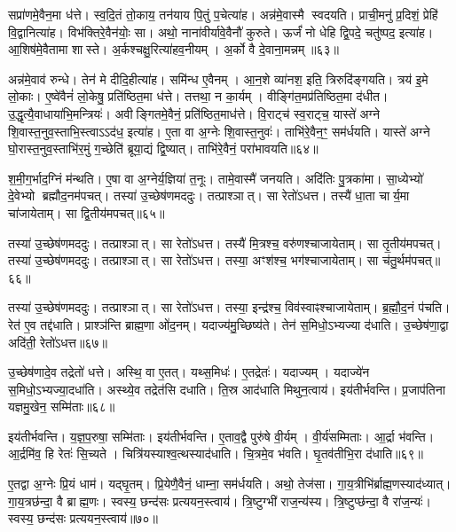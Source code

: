सप्रा॑णमे॒वैन॒मा ध॑त्ते।
स्व॒दि॒तं तो॒काय॒ तन॑याय पि॒तुं प॒चेत्या॑ह।
अन्न॑मे॒वास्मै स्वदयति।
प्राची॒मनु॑ प्र॒दिशं॒ प्रेहि॑ वि॒द्वानित्या॑ह।
विभ॑क्तिरे॒वैन॑योः॒ सा।
अथो॒ नाना॑वीर्यावे॒वैनौ॑ कुरुते।
ऊर्जं॑ नो धेहि द्वि॒पदे॒ चतु॑ष्पद॒ इत्या॑ह।
आ॒शिष॑मे॒वैतामा शास्ते।
अ॒र्कश्चक्षु॒रित्या॑हव॒नीयम्।
अ॒र्को वै दे॒वाना॒मन्नम्॥६३॥

अन्न॑मे॒वाव॑ रुन्धे।
तेन॑ मे दीदि॒हीत्या॑ह।
समि॑न्ध ए॒वैनम्।
आ॒न॒शे व्या॑नश॒ इति॒ त्रिरुदि॑ङ्गयति।
त्रय॑ इ॒मे लो॒काः।
ए॒ष्वे॑वैनं॑ लो॒केषु॒ प्रति॑ष्ठित॒मा ध॑त्ते।
तत्तथा॒ न का॒र्यम्।
वीङ्गि॑त॒मप्र॑तिष्ठित॒मा द॑धीत।
उ॒द्धृत्यै॒वाधाया॑भि॒मन्त्रियः॑।
अवीङ्गितमे॒वैनं॒ प्रति॑ष्ठित॒माध॑त्ते।
वि॒राट्च॑ स्व॒राट्च॒ यास्ते॑ अग्ने शि॒वास्त॒नुव॒स्ताभि॒स्त्वा\-ऽऽद॑ध॒ इत्या॑ह।
ए॒ता वा अ॒ग्नेः शि॒वास्त॒नुवः॑।
ताभि॑रे॒वैन॒ꣳ॒ सम॑र्धयति।
यास्ते॑ अग्ने घो॒रास्त॒नुव॒स्ताभि॑र॒मुं ग॒च्छेति॑ ब्रूया॒द्यं द्वि॒ष्यात्।
ताभि॑रे॒वैनं॒ परा॑भावयति॥६४॥\anuvakamend[लो॒को॑\-ऽसृजतैन॒माध॑त्ते\-ऽन्वाहार्य॒पच॑नं दे॒वाना॒मन्न॑मेनं॒ प्रति॑ष्ठित॒माध॑त्ते॒ पञ्च॑ च]

श॒मी॒ग॒र्भाद॒ग्निं म॑न्थति।
ए॒षा वा अ॒ग्नेर्य॒ज्ञिया॑ त॒नूः।
तामे॒वास्मै॑ जनयति।
अदि॑तिः पु॒त्रका॑मा।
सा॒ध्येभ्यो॑ दे॒वेभ्यो ब्रह्मौद॒नम॑पचत्।
तस्या॑ उ॒च्छेष॑णमददुः।
तत्प्राश्ञात्।
सा रेतो॑\-ऽधत्त।
तस्यै॑ धा॒ता चार्य॒मा चा॑जायेताम्।
सा द्वि॒तीय॑मपचत्॥६५॥

तस्या॑ उ॒च्छेष॑णमददुः।
तत्प्राश्ञात्।
सा रेतो॑\-ऽधत्त।
तस्यै॑ मि॒त्रश्च॒ वरु॑णश्चाजायेताम्।
सा तृ॒तीय॑मपचत्।
तस्या॑ उ॒च्छेष॑णमददुः।
तत्प्राश्ञात्।
सा रेतो॑\-ऽधत्त।
तस्या॒ अꣳश॑श्च॒ भग॑श्चाजायेताम्।
सा च॑तु॒र्थम॑पचत्॥६६॥

तस्या॑ उ॒च्छेष॑णमददुः।
तत्प्राश्ञात्।
सा रेतो॑\-ऽधत्त।
तस्या॒ इन्द्र॑श्च॒ विव॑स्वाꣴश्चाजायेताम्।
ब्र॒ह्मौ॒द॒नं प॑चति।
रेत॑ ए॒व तद्द॑धाति।
प्राश्ञ॑न्ति ब्राह्म॒णा ओ॑द॒नम्।
यदाज्य॑मु॒च्छिष्य॑ते।
तेन॑ स॒मिधो॒\-ऽभ्यज्या द॑धाति।
उ॒च्छेष॑णा॒द्वा अदि॑ती॒ रेतो॑\-ऽधत्त॥६७॥

उ॒च्छेष॑णादे॒व तद्रेतो॑ धत्ते।
अस्थि॒ वा ए॒तत्।
यथ्स॒मिधः॑।
ए॒तद्रेतः॑।
यदाज्यम्।
यदाज्ये॑न स॒मिधो॒\-ऽभ्यज्या॒दधा॑ति।
अस्थ्ये॒व तद्रेत॑सि दधाति।
ति॒स्र आद॑धाति मिथुन॒त्वाय॑।
इय॑तीर्भवन्ति।
प्र॒जाप॑तिना यज्ञमु॒खेन॒ सम्मि॑ताः॥६८॥

इय॑तीर्भवन्ति।
य॒ज्ञ॒प॒रुषा॒ सम्मि॑ताः।
इय॑तीर्भवन्ति।
ए॒ताव॒द्वै पुरु॑षे वी॒र्यम्।
वी॒र्य॑सम्मिताः।
आ॒र्द्रा भ॑वन्ति।
आ॒र्द्रमि॑व॒ हि रेतः॑ सि॒च्यते।
चित्रि॑यस्याश्व॒त्थस्याद॑धाति।
चि॒त्रमे॒व भ॑वति।
घृ॒तव॑तीभि॒रा द॑धाति॥६९॥

ए॒तद्वा अ॒ग्नेः प्रि॒यं धाम॑।
यद्\mbox{}घृ॒तम्।
प्रि॒येणै॒वैनं॒ धाम्ना॒ सम॑र्धयति।
अथो॒ तेज॑सा।
गा॒य॒त्रीभि॑र्ब्राह्म॒णस्याद॑ध्यात्।
गा॒य॒त्रछ॑न्दा॒ वै ब्राह्म॒णः।
स्वस्य॒ छन्द॑सः प्रत्ययन॒स्त्वाय॑।
त्रि॒ष्टुग्भी॑ राज॒न्य॑स्य।
त्रि॒ष्टुप्छ॑न्दा॒ वै रा॑ज॒न्यः॑।
स्वस्य॒ छन्द॑सः प्रत्ययन॒स्त्वाय॑॥७०॥

